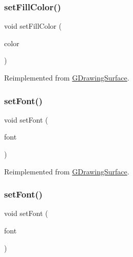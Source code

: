 \subsubsection{\texorpdfstring{set\+Fill\+Color()}{setFillColor()}\hspace{0.1cm}{\footnotesize\ttfamily [2/2]}}
{\footnotesize\ttfamily void set\+Fill\+Color (\begin{DoxyParamCaption}\item[{const std\+::string \&}]{color }\end{DoxyParamCaption})\hspace{0.3cm}{\ttfamily [virtual]}}



Reimplemented from \mbox{\hyperlink{classGDrawingSurface_adbc18b1a930aadd97d7437f9f7265b96}{G\+Drawing\+Surface}}.

\mbox{\label{classGForwardDrawingSurface_a2d22014c7fa3bccfd58c982aea1b55fa}} 
\subsubsection{\texorpdfstring{set\+Font()}{setFont()}\hspace{0.1cm}{\footnotesize\ttfamily [1/2]}}
{\footnotesize\ttfamily void set\+Font (\begin{DoxyParamCaption}\item[{const Q\+Font \&}]{font }\end{DoxyParamCaption})\hspace{0.3cm}{\ttfamily [virtual]}}



Reimplemented from \mbox{\hyperlink{classGDrawingSurface_a2592348886ffea646c6534bf88f7c49d}{G\+Drawing\+Surface}}.

\mbox{\label{classGForwardDrawingSurface_ab39ef411fb13a52852ddd138c5932e2e}} 
\subsubsection{\texorpdfstring{set\+Font()}{setFont()}\hspace{0.1cm}{\footnotesize\ttfamily [2/2]}}
{\footnotesize\ttfamily void set\+Font (\begin{DoxyParamCaption}\item[{const std\+::string \&}]{font }\end{DoxyParamCaption})\hspace{0.3cm}{\ttfamily [virtual]}}



